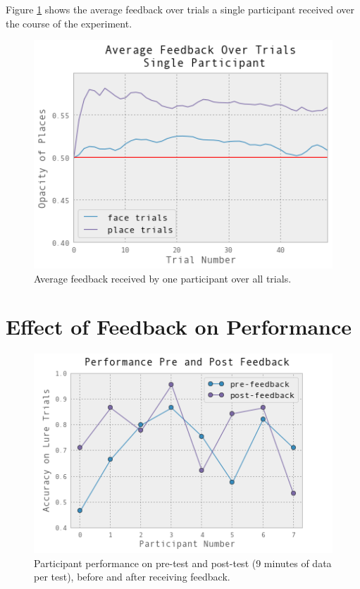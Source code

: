 \documentclass[12pt]{report}
\begin{document}
Figure \ref{avgfeedbacktrial} shows the average feedback over trials a single participant received over the course of the experiment.  
\begin{figure}[t]
\centering
\includegraphics[width=4.5in]{average_feedback_trial}
\caption{Average feedback received by one participant over all trials.\label{avgfeedbacktrial}}
\end{figure}
  
\chapter{Effect of Feedback on Performance}
\begin{figure}[t]
\centering
\includegraphics[width=4.5in]{accprepost}
\caption{Participant performance on pre-test and post-test (9 minutes of data per test), before and after receiving feedback. \label{accprepost}}
\end{figure}
\end{document}
